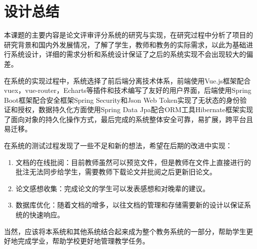 
\chapter*{\hfill 设计总结 \hfill}
\label{conclusion}

本课题的主要内容是论文评审评分系统的研究与实现，在研究过程中分析了项目的研究背景和国内外发展情况，了解了学生，教师和教务的实际需求，以此为基础进行系统设计，详细的需求分析和系统设计保证了之后的系统实现不会出现较大的偏差。

在系统的实现过程中，系统选择了前后端分离技术体系，前端使用Vue.js框架配合vuex，vue-router，Echarts等插件和技术编写了友好的用户界面，后端使用Spring Boot框架配合安全框架Spring Security和Json Web Token实现了无状态的身份验证和授权，数据持久化方面使用Spring Data Jpa配合ORM工具Hibernate框架实现了面向对象的持久化操作方式，最后完成的系统整体安全可靠，易扩展，跨平台且易迁移。

在系统的测试过程发现了一些不足和新的想法，希望在后期的改进中实现：
\begin{enumerate}
    \item 文档的在线批阅：目前教师虽然可以预览文件，但是教师在文件上直接进行的批注无法同步给学生，需要教师下载论文并批阅之后更新旧论文。
    \item 论文感想收集：完成论文的学生可以发表感想和对晚辈的建议。
    \item 数据库优化：随着文档的增多，以往文档的管理和存储需要新的设计以保证系统的快速响应。
\end{enumerate}

当然，应该将本系统和其他系统结合起来成为整个教务系统的一部分，帮助学生更好地完成学业，帮助学校更好地管理教学任务。